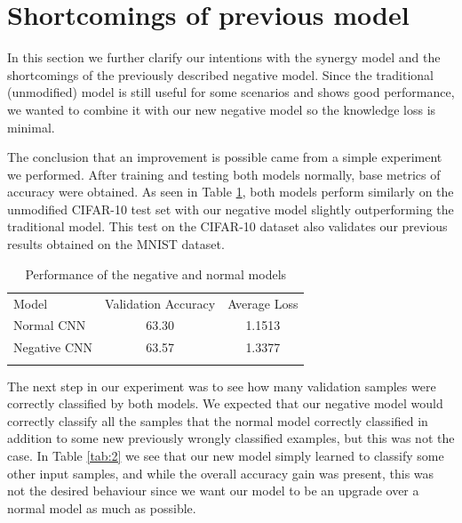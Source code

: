 \documentclass[b5paper]{book}
\begin{document}
\section{Shortcomings of previous model}
\label{shortcomings}

In this section we further clarify our intentions with the synergy model and the shortcomings of the previously described negative model. Since the traditional (unmodified) model is still useful for some scenarios and shows good performance, we wanted to combine it with our new negative model so the knowledge loss is minimal. 

The conclusion that an improvement is possible came from a simple experiment we performed. After training and testing both models normally, base metrics of accuracy were obtained. As seen in Table \ref{tab:1}, both models perform similarly on the unmodified CIFAR-10 test set with our negative model slightly outperforming the traditional model. This test on the CIFAR-10 dataset also validates our previous results obtained on the MNIST dataset. 

\begin{table}
\centering
\caption{Performance of the negative and normal models}
\label{tab:1}
\begin{tabular}{lcc}
\hline\noalign{\smallskip}
Model & Validation Accuracy & Average Loss  \\
\noalign{\smallskip}\hline\noalign{\smallskip}
Normal CNN & 63.30 & 1.1513 \\
Negative CNN & 63.57 & 1.3377 \\
\noalign{\smallskip}\hline
\end{tabular}
\end{table}

The next step in our experiment was to see how many validation samples were correctly classified by both models. We expected that our negative model would correctly classify all the samples that the normal model correctly classified in addition to some new previously wrongly classified examples, but this was not the case. In Table \ref{tab:2} we see that our new model simply learned to classify some other input samples, and while the overall accuracy gain was present, this was not the desired behaviour since we want our model to be an upgrade over a normal model as much as possible. 
\end{document}
